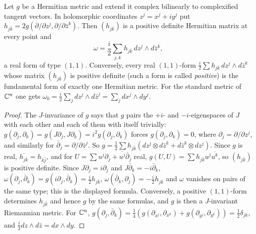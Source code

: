 \begin{proposition}\label{kahler:proposition-fundamental-form-coordinates}
Let $g$ be a Hermitian metric and extend it complex bilinearly to complexified tangent vectors. In holomorphic coordinates
$z^j = x^j + iy^j$ put $h_{j\bar k} = 2g(\partial/\partial z^j, \partial/\partial\bar z^k)$. Then $(h_{j\bar k})$ is a positive definite
Hermitian matrix at every point and
\[
\omega = \frac{i}{2}\sum_{j,k}h_{j\bar k}\,dz^j \wedge d\bar z^k,
\]
a real form of type $(1,1)$. Conversely, every real $(1,1)$-form $\frac{i}{2}\sum h_{j\bar k}\,dz^j \wedge d\bar z^k$ whose matrix
$(h_{j\bar k})$ is positive definite (such a form is called \emph{positive}) is the fundamental form of exactly one Hermitian metric. For the
standard metric of $\mathbb{C}^n$ one gets $\omega_0 = \frac{i}{2}\sum_jdz^j \wedge d\bar z^j = \sum_jdx^j \wedge dy^j$.
\end{proposition}

\begin{proof}
The $J$-invariance of $g$ says that $g$ pairs the $+i$- and $-i$-eigenspaces of $J$ with each other and each of them with itself
trivially: $g(\partial_j, \partial_k) = g(J\partial_j, J\partial_k) = i^2g(\partial_j, \partial_k)$ forces $g(\partial_j, \partial_k) = 0$,
where $\partial_j = \partial/\partial z^j$, and similarly for $\bar\partial_j = \partial/\partial\bar z^j$. So
$g = \frac12\sum h_{j\bar k}(dz^j \otimes d\bar z^k + d\bar z^k \otimes dz^j)$. Since $g$ is real, $\overline{h_{j\bar k}} = h_{k\bar j}$,
and for $U = \sum u^j\partial_j + \overline{u^j}\bar\partial_j$ real, $g(U, U) = \sum h_{j\bar k}u^j\overline{u^k}$, so $(h_{j\bar k})$ is
positive definite. Since $J\partial_j = i\partial_j$ and $J\bar\partial_k = -i\bar\partial_k$,
$\omega(\partial_j, \bar\partial_k) = g(i\partial_j, \bar\partial_k) = \frac{i}{2}h_{j\bar k}$,
$\omega(\bar\partial_k, \partial_j) = -\frac{i}{2}h_{j\bar k}$ and $\omega$ vanishes on pairs of the same type; this is the displayed
formula. Conversely, a positive $(1,1)$-form determines $h_{j\bar k}$ and hence $g$ by the same formulas, and $g$ is then a $J$-invariant
Riemannian metric. For $\mathbb{C}^n$, $g(\partial_j, \bar\partial_k) = \frac14(g(\partial_{x^j}, \partial_{x^k}) + g(\partial_{y^j}, \partial_{y^k})) = \frac12\delta_{jk}$, and
$\frac{i}{2}dz \wedge d\bar z = dx \wedge dy$.
\end{proof}

